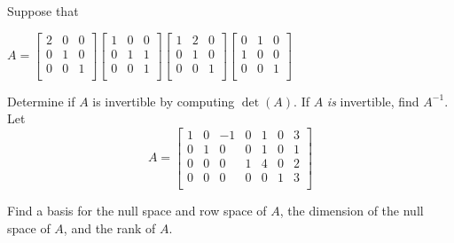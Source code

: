 \documentclass[11pt]{exam}
\begin{document}
\begin{questions}

\newpage
\addpoints
\question[20]

Suppose that 

$A= 
\begin{bmatrix}
2 & 0 & 0 \\
0 & 1 & 0 \\
0 & 0 & 1 \\
\end{bmatrix}
\begin{bmatrix}
1 & 0 & 0 \\
0 & 1 & 1 \\
0 & 0 & 1 \\
\end{bmatrix}
\begin{bmatrix}
1 & 2 & 0 \\
0 & 1 & 0 \\
0 & 0 & 1 \\
\end{bmatrix}
\begin{bmatrix}
0 & 1 & 0 \\
1 & 0 & 0 \\
0 & 0 & 1 \\
\end{bmatrix}
$

Determine if $A$ is invertible by computing $\det(A)$. If $A$ \textit{is} invertible, find $A^{-1}$. 
\newpage
\addpoints
\question[20]
Let 
$$
A
=
\begin{bmatrix}
1 & 0 & -1 & 0 & 1 & 0 & 3 \\
0 & 1 & 0 & 0 & 1 & 0 & 1 \\
0 & 0 & 0 & 1 & 4 & 0 & 2 \\
0 & 0 & 0 & 0 & 0 & 1 & 3 \\
\end{bmatrix}
$$

Find a basis for the null space and row space of $A$, the dimension of the null space of $A$, and the rank of $A$.  



\end{questions}

\end{document}
